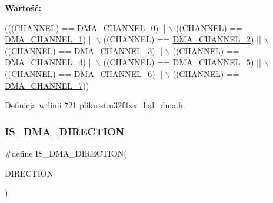 {\bfseries Wartość\+:}
\begin{DoxyCode}
(((CHANNEL) == \hyperlink{group___d_m_a___channel__selection_gabd7de138931e93a90fc6c4eab5916bbe}{DMA\_CHANNEL\_0}) || \(\backslash\)
                                 ((CHANNEL) == \hyperlink{group___d_m_a___channel__selection_ga283364370e9876af6406b9fa70e2944f}{DMA\_CHANNEL\_1}) || \(\backslash\)
                                 ((CHANNEL) == \hyperlink{group___d_m_a___channel__selection_ga9688f3e78cbc2109d214b7ca049e22df}{DMA\_CHANNEL\_2}) || \(\backslash\)
                                 ((CHANNEL) == \hyperlink{group___d_m_a___channel__selection_gac689673fec4d72ede49a0d657e3a7e70}{DMA\_CHANNEL\_3}) || \(\backslash\)
                                 ((CHANNEL) == \hyperlink{group___d_m_a___channel__selection_ga51b51f5b39e23b28ad99520ad5be596f}{DMA\_CHANNEL\_4}) || \(\backslash\)
                                 ((CHANNEL) == \hyperlink{group___d_m_a___channel__selection_gafbaa82f3cff89858e50363c04ed0cca0}{DMA\_CHANNEL\_5}) || \(\backslash\)
                                 ((CHANNEL) == \hyperlink{group___d_m_a___channel__selection_gad23679661d8da3bc1aaacc62f99821f7}{DMA\_CHANNEL\_6}) || \(\backslash\)
                                 ((CHANNEL) == \hyperlink{group___d_m_a___channel__selection_ga77ff4e8675a3991feb20e385242f34ab}{DMA\_CHANNEL\_7}))
\end{DoxyCode}


Definicja w linii 721 pliku stm32f4xx\+\_\+hal\+\_\+dma.\+h.

\mbox{\label{group___d_m_a___private___macros_gae2b02e8e823854bcd7c5746cdd29e70d}} 
\subsubsection{\texorpdfstring{I\+S\+\_\+\+D\+M\+A\+\_\+\+D\+I\+R\+E\+C\+T\+I\+ON}{IS\_DMA\_DIRECTION}}
{\footnotesize\ttfamily \#define I\+S\+\_\+\+D\+M\+A\+\_\+\+D\+I\+R\+E\+C\+T\+I\+ON(\begin{DoxyParamCaption}\item[{}]{D\+I\+R\+E\+C\+T\+I\+ON }\end{DoxyParamCaption})}


